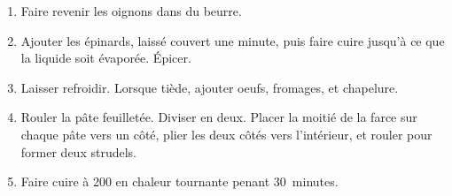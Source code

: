 
\begin{ingredients}
\end{ingredients}


\begin{recipe}
  \begin{enumerate}

  \item Faire revenir les oignons dans du beurre.
    
  \item Ajouter les épinards, laissé couvert une minute, puis faire
    cuire jusqu'à ce que la liquide soit évaporée.  Épicer.

  \item Laisser refroidir.  Lorsque tiède, ajouter oeufs, fromages, et
    chapelure.

  \item Rouler la pâte feuilletée.  Diviser en deux.  Placer la moitié
    de la farce sur chaque pâte vers un côté, plier les deux côtés
    vers l'intérieur, et rouler pour former deux strudels.
    
  \item Faire cuire à 200\degreeC{} en chaleur tournante penant 30~minutes.

  \end{enumerate}
\end{recipe}

